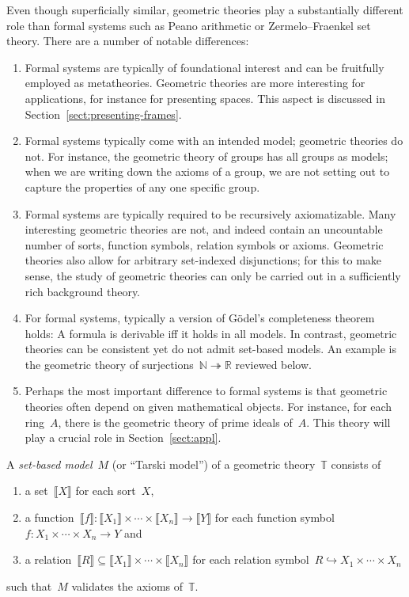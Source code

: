 \documentclass{ws-rv9x6}
\newcommand{\NN}{\mathbb{N}}
\newcommand{\RR}{\mathbb{R}}
\newcommand{\TT}{\mathbb{T}}
\renewcommand{\_}{\mathpunct{.}}
\newcommand{\?}{\,{:}\,}
\newcommand{\brak}[1]{{\llbracket{#1}\rrbracket}}
\begin{document}
Even though superficially similar, geometric theories play a
substantially different role than formal systems such as Peano arithmetic or
Zermelo--Fraenkel set theory. There are a number of notable differences:
\begin{enumerate}
\item Formal systems are typically of foundational interest and can be
fruitfully employed as metatheories. Geometric theories are more interesting
for applications, for instance for presenting spaces. This aspect is discussed
in Section~\ref{sect:presenting-frames}.
\item Formal systems typically come with an intended model; geometric theories
do not. For instance, the geometric theory of groups has all groups as models;
when we are writing down the axioms of a group, we are not setting out to
capture the properties of any one specific group.
\item Formal systems are typically required to be recursively
axiomatizable. Many interesting geometric theories are not, and indeed contain
an uncountable number of sorts, function symbols, relation symbols or axioms. Geometric theories also allow for arbitrary
set-indexed disjunctions; for this to make sense, the study of geometric
theories can only be carried out in a sufficiently rich background theory.
\item For formal systems, typically a version of Gödel's completeness theorem
holds: A formula is derivable iff it holds in all models. In contrast,
geometric theories can be consistent yet do not admit set-based models. An
example is the geometric theory of surjections~$\NN \twoheadrightarrow \RR$
reviewed below.
\item Perhaps the most important difference to formal systems is that geometric
theories often depend on given mathematical objects. For instance, for each
ring~$A$, there is the geometric theory of prime ideals of~$A$. This theory
will play a crucial role in Section~\ref{sect:appl}.
\end{enumerate}

\begin{definition}A \emph{set-based model}~$M$ (or ``Tarski model'') of a
geometric theory~$\TT$ consists of
\begin{enumerate}
  \item a set~$\brak{X}$ for each sort~$X$,
  \item a function~$\brak{f} : \brak{X_1} \times \cdots \times \brak{X_n} \to
  \brak{Y}$
  for each function symbol~$f : X_1 \times \cdots \times X_n \to Y$ and
  \item a relation~$\brak{R} \subseteq \brak{X_1} \times \cdots \times \brak{X_n}$
  for each relation symbol~$R \hookrightarrow X_1 \times \cdots \times X_n$
\end{enumerate}
such that~$M$ validates the axioms of~$\TT$.
\end{definition}
\end{document}
